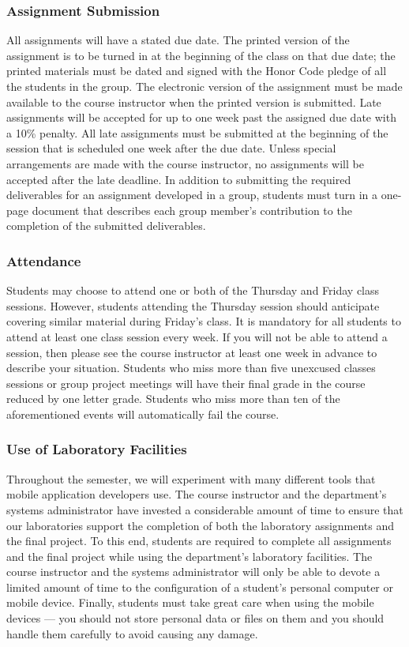 \subsubsection*{Assignment Submission}

All assignments will have a stated due date. The printed version of the assignment is to be turned in at the beginning
of the class on that due date; the printed materials must be dated and signed with the Honor Code pledge of all the
students in the group.  The electronic version of the assignment must be made available to the course instructor when
the printed version is submitted. Late assignments will be accepted for up to one week past the assigned due date with a
10\% penalty. All late assignments must be submitted at the beginning of the session that is scheduled one week after
the due date. Unless special arrangements are made with the course instructor, no assignments will be accepted after the
late deadline. In addition to submitting the required deliverables for an assignment developed in a group, students must
turn in a one-page document that describes each group member's contribution to the completion of the submitted deliverables.  

\subsubsection*{Attendance}

Students may choose to attend one or both of the Thursday and Friday class sessions.  However, students attending the
Thursday session should anticipate covering similar material during Friday's class.  It is mandatory for all students to
attend at least one class session every week. If you will not be able to attend a session, then please see the course
instructor at least one week in advance to describe your situation.  Students who miss more than five unexcused classes
sessions or group project meetings will have their final grade in the course reduced by one letter grade.  Students who
miss more than ten of the aforementioned events will automatically fail the course.

\subsubsection*{Use of Laboratory Facilities}

Throughout the semester, we will experiment with many different tools that mobile application developers use.  The
course instructor and the department's systems administrator have invested a considerable amount of time to ensure that
our laboratories support the completion of both the laboratory assignments and the final project.  To this end, students
are required to complete all assignments and the final project while using the department's laboratory facilities. The
course instructor and the systems administrator will only be able to devote a limited amount of time to the
configuration of a student's personal computer or mobile device. Finally, students must take great care when using the
mobile devices --- you should not store personal data or files on them and you should handle them carefully to avoid
causing any damage.

